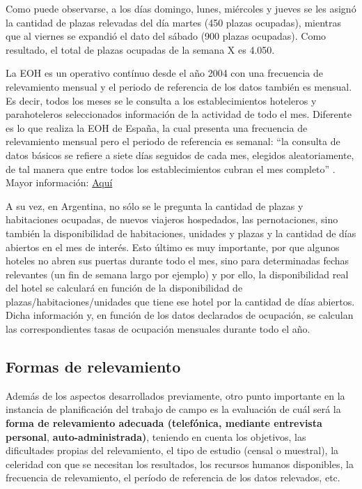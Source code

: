 \documentclass[
]{book}
\begin{document}
Como puede observarse, a los días domingo, lunes, miércoles y jueves se les asignó la cantidad de plazas relevadas del día martes (450 plazas ocupadas), mientras que al viernes se expandió el dato del sábado (900 plazas ocupadas). Como resultado, el total de plazas ocupadas de la semana X es 4.050.

La EOH es un operativo contínuo desde el año 2004 con una frecuencia de relevamiento mensual y el periodo de referencia de los datos también es mensual. Es decir, todos los meses se le consulta a los establecimientos hoteleros y parahoteleros seleccionados información de la actividad de todo el mes. Diferente es lo que realiza la EOH de España, la cual presenta una frecuencia de relevamiento mensual pero el periodo de referencia es semanal: ``la consulta de datos básicos se refiere a siete días seguidos de cada mes, elegidos aleatoriamente, de tal manera que entre todos los establecimientos cubran el mes completo'' . Mayor información: \href{https://www.ine.es/daco/daco42/ocuphotel/notaeoh.htm}{Aquí}

A su vez, en Argentina, no sólo se le pregunta la cantidad de plazas y habitaciones ocupadas, de nuevos viajeros hospedados, las pernotaciones, sino también la disponibilidad de habitaciones, unidades y plazas y la cantidad de días abiertos en el mes de interés. Esto último es muy importante, por que algunos hoteles no abren sus puertas durante todo el mes, sino para determinadas fechas relevantes (un fin de semana largo por ejemplo) y por ello, la disponibilidad real del hotel se calculará en función de la disponibilidad de plazas/habitaciones/unidades que tiene ese hotel por la cantidad de días abiertos. Dicha información y, en función de los datos declarados de ocupación, se calculan las correspondientes tasas de ocupación mensuales durante todo el año.

\hypertarget{formas-de-relevamiento}{%
\subsection{Formas de relevamiento}\label{formas-de-relevamiento}}

Además de los aspectos desarrollados previamente, otro punto importante en la instancia de planificación del trabajo de campo es la evaluación de cuál será la \textbf{forma de relevamiento adecuada (telefónica, mediante entrevista personal}, \textbf{auto-administrada)}, teniendo en cuenta los objetivos, las dificultades propias del relevamiento, el tipo de estudio (censal o muestral), la celeridad con que se necesitan los resultados, los recursos humanos disponibles, la frecuencia de relevamiento, el período de referencia de los datos relevados, etc.
\end{document}
